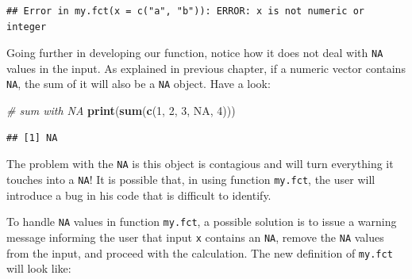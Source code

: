 \documentclass[11pt,]{book}
\newenvironment{Shaded}{\begin{snugshade}}{\end{snugshade}}
\newcommand{\KeywordTok}[1]{\textcolor[rgb]{0.27,0.27,0.27}{\textbf{#1}}}
\newcommand{\DecValTok}[1]{\textcolor[rgb]{0.06,0.06,0.06}{#1}}
\newcommand{\CommentTok}[1]{\textcolor[rgb]{0.56,0.35,0.01}{\textit{#1}}}
\newcommand{\OtherTok}[1]{\textcolor[rgb]{0.56,0.35,0.01}{#1}}
\newcommand{\NormalTok}[1]{#1}
\begin{document}
\begin{verbatim}
## Error in my.fct(x = c("a", "b")): ERROR: x is not numeric or integer
\end{verbatim}

Going further in developing our function, notice how it does not deal
with \texttt{NA} values in the input. As explained in previous chapter,
if a numeric vector contains \texttt{NA}, the sum of it will also be a
\texttt{NA} object. Have a look:

\begin{Shaded}
\begin{Highlighting}[]
\CommentTok{# sum with NA}
\KeywordTok{print}\NormalTok{(}\KeywordTok{sum}\NormalTok{(}\KeywordTok{c}\NormalTok{(}\DecValTok{1}\NormalTok{, }\DecValTok{2}\NormalTok{, }\DecValTok{3}\NormalTok{, }\OtherTok{NA}\NormalTok{, }\DecValTok{4}\NormalTok{)))}
\end{Highlighting}
\end{Shaded}

\begin{verbatim}
## [1] NA
\end{verbatim}

The problem with the \texttt{NA} is this object is contagious and will
turn everything it touches into a \texttt{NA}! It is possible that, in
using function \texttt{my.fct}, the user will introduce a bug in his
code that is difficult to identify.

To handle \texttt{NA} values in function \texttt{my.fct}, a possible
solution is to issue a warning message informing the user that input
\texttt{x} contains an \texttt{NA}, remove the \texttt{NA} values from
the input, and proceed with the calculation. The new definition of
\texttt{my.fct} will look like:
\end{document}
